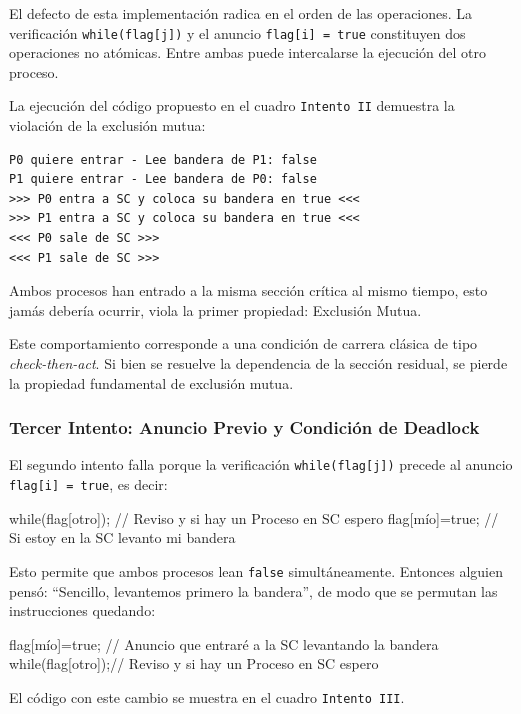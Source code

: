 El defecto de esta implementación radica en el orden de las operaciones. La verificación \texttt{while(flag[j])} y el anuncio \texttt{flag[i] = true} constituyen dos operaciones no atómicas. Entre ambas puede intercalarse la ejecución del otro proceso.

La ejecución del código propuesto en el cuadro \texttt{Intento II} demuestra la violación de la exclusión mutua:
\begingroup
\footnotesize
\begin{verbatim}
P0 quiere entrar - Lee bandera de P1: false
P1 quiere entrar - Lee bandera de P0: false
>>> P0 entra a SC y coloca su bandera en true <<<
>>> P1 entra a SC y coloca su bandera en true <<<
<<< P0 sale de SC >>>
<<< P1 sale de SC >>>
\end{verbatim}
\endgroup
Ambos procesos han entrado a la misma sección crítica al mismo tiempo, esto jamás debería ocurrir, viola la primer propiedad: Exclusión Mutua.

Este comportamiento corresponde a una condición de carrera clásica de tipo \textit{check-then-act}. Si bien se resuelve la dependencia de la sección residual, se pierde la propiedad fundamental de exclusión mutua.

\subsubsection{Tercer Intento: Anuncio Previo y Condición de Deadlock}

El segundo intento falla porque la verificación \texttt{while(flag[j])} precede al anuncio \texttt{flag[i] = true}, es decir:
\begin{ccode}
while(flag[otro]);  // Reviso y si hay un Proceso en SC espero
flag[mío]=true;     // Si estoy en la SC levanto mi bandera 
\end{ccode}
Esto permite que ambos procesos lean \texttt{false} simultáneamente. Entonces alguien pensó: ``Sencillo, levantemos primero la bandera'', de modo que se permutan las instrucciones quedando:
\begin{ccode}
flag[mío]=true;   // Anuncio que entraré a la SC levantando la bandera
while(flag[otro]);// Reviso y si hay un Proceso en SC espero
\end{ccode}
El código con este cambio se muestra en el cuadro \texttt{Intento III}.

